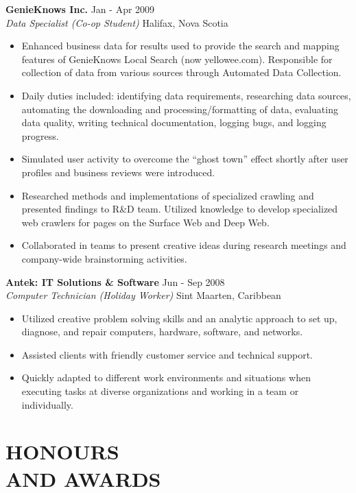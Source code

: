 \documentclass[margin]{res}
\begin{document}
\begin{resume}
	\textbf{GenieKnows Inc.} \hfill Jan - Apr 2009 \\
    {\sl Data Specialist (Co-op Student)} \hfill Halifax, Nova Scotia
	\begin{itemize}  \itemsep -2pt %
	  \item Enhanced business data for results used to provide the search and mapping features of
	  GenieKnows Local Search (now yellowee.com).
	  Responsible for collection of data from various sources through Automated Data Collection.
	  \item Daily duties included: identifying data requirements,
	  researching data sources, automating the downloading and processing/formatting of data,
	  evaluating data quality, writing technical documentation, logging bugs, and logging progress.
	  \item Simulated user activity to overcome the ``ghost town'' effect shortly after user
	  profiles and business reviews were introduced. %
	  \item Researched methods and implementations of specialized crawling and presented findings
	  to R\&D team.
	  Utilized knowledge to develop specialized web crawlers for pages on the Surface Web and Deep Web.
	  \item Collaborated in teams to present creative ideas during research meetings and company-wide
	  brainstorming activities.
	\end{itemize}

	\textbf{Antek: IT Solutions \& Software} \hfill Jun - Sep 2008 \\
    {\sl Computer Technician (Holiday Worker)} \hfill Sint Maarten, Caribbean
	\begin{itemize}  \itemsep -2pt %
	  \item Utilized creative problem solving skills and an analytic approach to set up, diagnose,
	  and repair computers, hardware, software, and networks.
	  \item Assisted clients with friendly customer service and technical support.
	  \item Quickly adapted to different work environments and situations when executing tasks at
	  diverse organizations and working in a team or individually.
	\end{itemize}

\section{HONOURS \\ AND AWARDS}


\end{resume}
\end{document}
